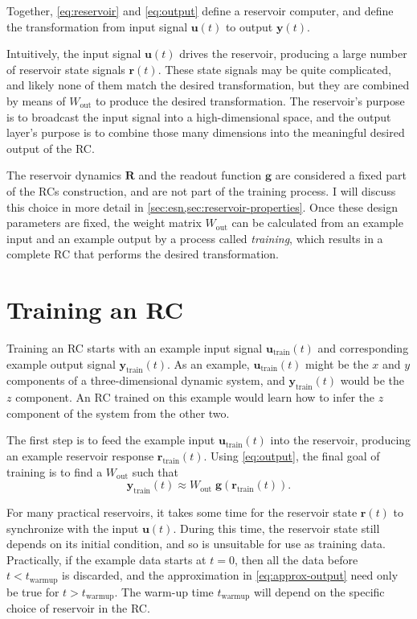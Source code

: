 Together, \cref{eq:reservoir} and \cref{eq:output} define a reservoir
computer, and define the transformation from input signal $\bm{u}(t)$
to output $\bm{y}(t)$.

Intuitively, the input signal $\bm{u}(t)$ drives the reservoir,
producing a large number of reservoir state signals $\bm{r}(t)$. These
state signals may be quite complicated, and likely none of them match
the desired transformation, but they are combined by means of
$W_\text{out}$ to produce the desired transformation. The reservoir's
purpose is to broadcast the input signal into a high-dimensional
space, and the output layer's purpose is to combine those many dimensions
into the meaningful desired output of the RC.

The reservoir dynamics $\bm{R}$ and the readout function $\bm{g}$ are
considered a fixed part of the RCs construction, and are not part of
the training process. I will discuss this choice in more detail in
\cref{sec:esn,sec:reservoir-properties}. Once these design parameters
are fixed, the weight matrix $W_\text{out}$ can be calculated from an
example input and an example output by a process called
\emph{training}, which results in a complete RC that performs the desired
transformation.

\section{Training an RC}\label{sec:training}

Training an RC starts with an example input signal
$\bm{u}_\text{train}(t)$ and corresponding example output signal
$\bm{y}_\text{train}(t)$. As an example, $\bm{u}_\text{train}(t)$ might be
the $x$ and $y$ components of a three-dimensional dynamic system, and
$\bm{y}_\text{train}(t)$ would be the $z$ component. An RC trained on this
example would learn how to infer the $z$ component of the system from
the other two.

The first step is to feed the example input $\bm{u}_\text{train}(t)$ into the reservoir, producing an example reservoir response $\bm{r}_\text{train}(t)$. Using \cref{eq:output}, the final goal of training is to find a $W_\text{out}$ such that
\begin{equation}
  \label{eq:approx-output}
  \mathbf{y}_\text{train}(t) \approx W_\text{out}\;\mathbf{g}\left(\mathbf{r}_\text{train}(t)\right).
\end{equation}

For many practical reservoirs, it takes some time for the reservoir
state $\bm{r}(t)$ to synchronize with the input $\bm{u}(t)$. During
this time, the reservoir state still depends on its initial condition,
and so is unsuitable for use as training data. Practically, if the
example data starts at $t = 0$, then all the data before $t <
t_\text{warmup}$ is discarded, and the approximation in
\cref{eq:approx-output} need only be true for $t >
t_\text{warmup}$. The warm-up time $t_\text{warmup}$ will depend on the
specific choice of reservoir in the RC.

